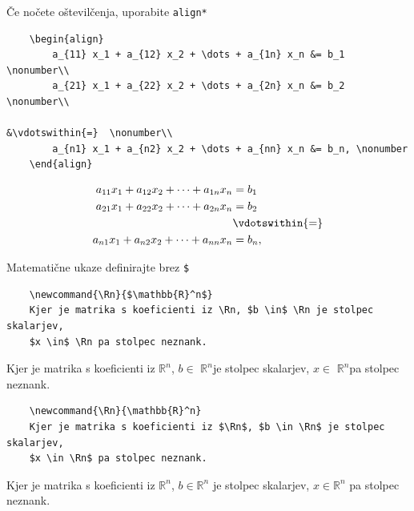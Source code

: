 \documentclass{beamer}
\begin{document}
\begin{frame}[fragile]{Če nočete oštevilčenja, uporabite \texttt{align*}}
    \begin{slaboenv}
    \begin{verbatim}
    \begin{align}
        a_{11} x_1 + a_{12} x_2 + \dots + a_{1n} x_n &= b_1 \nonumber\\
        a_{21} x_1 + a_{22} x_2 + \dots + a_{2n} x_n &= b_2 \nonumber\\
                                                        &\vdotswithin{=}  \nonumber\\
        a_{n1} x_1 + a_{n2} x_2 + \dots + a_{nn} x_n &= b_n, \nonumber
    \end{align}
    \end{verbatim}

    \begin{align}
        a_{11} x_1 + a_{12} x_2 + \dots + a_{1n} x_n &= b_1 \nonumber\\
        a_{21} x_1 + a_{22} x_2 + \dots + a_{2n} x_n &= b_2 \nonumber\\
                                                     &\vdotswithin{=}  \nonumber\\
        a_{n1} x_1 + a_{n2} x_2 + \dots + a_{nn} x_n &= b_n, \nonumber
    \end{align}
    \end{slaboenv}
\end{frame}

\begin{frame}[fragile]{Matematične ukaze definirajte brez \texttt{\$}}
    \begin{slaboenv}
    \begin{verbatim}
    \newcommand{\Rn}{$\mathbb{R}^n$}
    Kjer je matrika s koeficienti iz \Rn, $b \in$ \Rn je stolpec skalarjev,
    $x \in$ \Rn pa stolpec neznank.
    \end{verbatim}
    \newcommand{\Rn}{$\mathbb{R}^n$}
    Kjer je matrika s koeficienti iz \Rn, $b \in$ \Rn je stolpec skalarjev,
    $x \in$ \Rn pa stolpec neznank.
    \end{slaboenv}

    \begin{dobroenv}
    \begin{verbatim}
    \newcommand{\Rn}{\mathbb{R}^n}
    Kjer je matrika s koeficienti iz $\Rn$, $b \in \Rn$ je stolpec skalarjev,
    $x \in \Rn$ pa stolpec neznank.
    \end{verbatim}
    \newcommand{\Rn}{\mathbb{R}^n}
    Kjer je matrika s koeficienti iz $\Rn$, $b \in \Rn$ je stolpec skalarjev,
    $x \in \Rn$ pa stolpec neznank.
    \end{dobroenv}
\end{frame}
\end{document}
